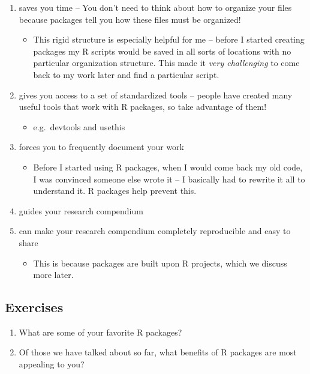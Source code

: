 \documentclass[
]{book}
\providecommand{\tightlist}{%
  \setlength{\itemsep}{0pt}\setlength{\parskip}{0pt}}
\begin{document}
\begin{enumerate}
\def\labelenumi{\arabic{enumi}.}
\tightlist
\item
  saves you time -- You don't need to think about how to organize your files because packages tell you how these files must be organized!

  \begin{itemize}
  \tightlist
  \item
    This rigid structure is especially helpful for me -- before I started creating packages my R scripts would be saved in all sorts of locations with no particular organization structure. This made it \emph{very challenging} to come back to my work later and find a particular script.
  \end{itemize}
\item
  gives you access to a set of standardized tools -- people have created many useful tools that work with R packages, so take advantage of them!

  \begin{itemize}
  \tightlist
  \item
    e.g.~devtools and usethis
  \end{itemize}
\item
  forces you to frequently document your work

  \begin{itemize}
  \tightlist
  \item
    Before I started using R packages, when I would come back my old code, I was convinced someone else wrote it -- I basically had to rewrite it all to understand it. R packages help prevent this.
  \end{itemize}
\item
  guides your research compendium
\item
  can make your research compendium completely reproducible and easy to share

  \begin{itemize}
  \tightlist
  \item
    This is because packages are built upon R projects, which we discuss more later.
  \end{itemize}
\end{enumerate}

\hypertarget{ex-set1}{%
\subsection{Exercises}\label{ex-set1}}

\begin{enumerate}
\def\labelenumi{\arabic{enumi}.}
\item
  What are some of your favorite R packages?
\item
  Of those we have talked about so far, what benefits of R packages are most appealing to you?
\end{enumerate}
\end{document}

